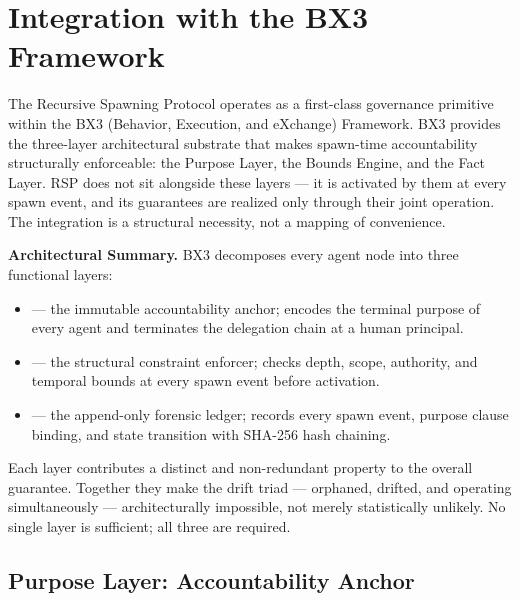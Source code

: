 
\section{Integration with the BX3 Framework}
\label{sec:bx3-integration}

The Recursive Spawning Protocol operates as a first-class governance primitive within the BX3 (Behavior, Execution, and eXchange) Framework. BX3 provides the three-layer architectural substrate that makes spawn-time accountability structurally enforceable: the Purpose Layer, the Bounds Engine, and the Fact Layer. RSP does not sit alongside these layers — it is activated by them at every spawn event, and its guarantees are realized only through their joint operation. The integration is a structural necessity, not a mapping of convenience.

\bigskip
\noindent\textbf{Architectural Summary.}
BX3 decomposes every agent node into three functional layers:

\begin{itemize}
  \item[\textbf{Purpose Layer}] — the immutable accountability anchor; encodes the terminal purpose of every agent and terminates the delegation chain at a human principal.
  \item[\textbf{Bounds Engine}] — the structural constraint enforcer; checks depth, scope, authority, and temporal bounds at every spawn event before activation.
  \item[\textbf{Fact Layer}] — the append-only forensic ledger; records every spawn event, purpose clause binding, and state transition with SHA-256 hash chaining.
\end{itemize}

Each layer contributes a distinct and non-redundant property to the overall guarantee. Together they make the drift triad — orphaned, drifted, and operating simultaneously — architecturally impossible, not merely statistically unlikely. No single layer is sufficient; all three are required.

\subsection{Purpose Layer: Accountability Anchor}

